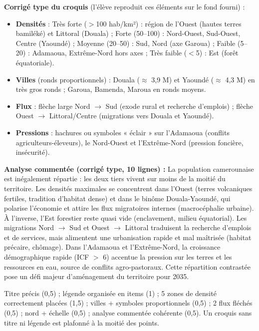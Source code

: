 \documentclass[11pt]{article}
\begin{document}
\begin{corrige}
\textbf{Corrigé type du croquis} (l'élève reproduit ces éléments sur le fond fourni) :
\begin{itemize}
    \item \textbf{Densités} : Très forte ($>$100 hab/km²) : région de l'Ouest (hautes terres bamiléké) et Littoral (Douala) ; Forte (50--100) : Nord-Ouest, Sud-Ouest, Centre (Yaoundé) ; Moyenne (20--50) : Sud, Nord (axe Garoua) ; Faible (5--20) : Adamaoua, Extrême-Nord hors axes ; Très faible ($<$5) : Est (forêt équatoriale).
    \item \textbf{Villes} (ronds proportionnels) : Douala ($\approx$ 3,9 M) et Yaoundé ($\approx$ 4,3 M) en très gros ronds ; Garoua, Bamenda, Maroua en ronds moyens.
    \item \textbf{Flux} : flèche large Nord $\rightarrow$ Sud (exode rural et recherche d'emplois) ; flèche Ouest $\rightarrow$ Littoral/Centre (migrations vers Douala et Yaoundé).
    \item \textbf{Pressions} : hachures ou symboles « éclair » sur l'Adamaoua (conflits agriculteurs-éleveurs), le Nord-Ouest et l'Extrême-Nord (pression foncière, insécurité).
\end{itemize}
\textbf{Analyse commentée (corrigé type, 10 lignes) :} La population camerounaise est inégalement répartie : les deux tiers vivent sur moins de la moitié du territoire. Les densités maximales se concentrent dans l'Ouest (terres volcaniques fertiles, tradition d'habitat dense) et dans le binôme Douala-Yaoundé, qui polarise l'économie et attire les flux migratoires internes (macrocéphalie urbaine). À l'inverse, l'Est forestier reste quasi vide (enclavement, milieu équatorial). Les migrations Nord $\rightarrow$ Sud et Ouest $\rightarrow$ Littoral traduisent la recherche d'emplois et de services, mais alimentent une urbanisation rapide et mal maîtrisée (habitat précaire, chômage). Dans l'Adamaoua et l'Extrême-Nord, la croissance démographique rapide (ICF $>$ 6) accentue la pression sur les terres et les ressources en eau, source de conflits agro-pastoraux. Cette répartition contrastée pose un défi majeur d'aménagement du territoire pour 2035.
\end{corrige}

\begin{attention}
Titre précis (0,5) ; légende organisée en items (1) ; 5 zones de densité correctement placées (1,5) ; villes + symboles proportionnels (0,5) ; 2 flux fléchés (0,5) ; nord + échelle (0,5) ; analyse commentée cohérente (0,5). Un croquis sans titre ni légende est plafonné à la moitié des points.
\end{attention}
\end{document}
